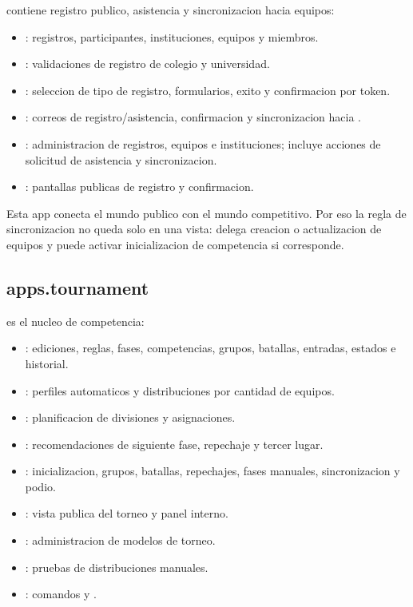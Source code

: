  contiene registro publico, asistencia y sincronizacion hacia equipos:

\begin{itemize}
  \item {}: registros, participantes, instituciones, equipos y miembros.
  \item {}: validaciones de registro de colegio y universidad.
  \item {}: seleccion de tipo de registro, formularios, exito y confirmacion por token.
  \item {}: correos de registro/asistencia, confirmacion y sincronizacion hacia .
  \item {}: administracion de registros, equipos e instituciones; incluye acciones de solicitud de asistencia y sincronizacion.
  \item {}: pantallas publicas de registro y confirmacion.
\end{itemize}

Esta app conecta el mundo publico con el mundo competitivo. Por eso la regla de sincronizacion no queda solo en una vista:  delega creacion o actualizacion de equipos y puede activar inicializacion de competencia si corresponde.

\subsection{apps.tournament}

 es el nucleo de competencia:

\begin{itemize}
  \item {}: ediciones, reglas, fases, competencias, grupos, batallas, entradas, estados e historial.
  \item {}: perfiles automaticos y distribuciones por cantidad de equipos.
  \item {}: planificacion de divisiones y asignaciones.
  \item {}: recomendaciones de siguiente fase, repechaje y tercer lugar.
  \item {}: inicializacion, grupos, batallas, repechajes, fases manuales, sincronizacion y podio.
  \item {}: vista publica del torneo y panel interno.
  \item {}: administracion de modelos de torneo.
  \item {}: pruebas de distribuciones manuales.
  \item {}: comandos  y .
\end{itemize}

